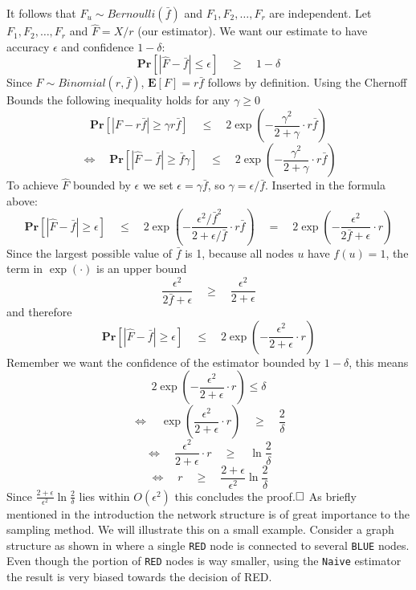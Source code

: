 It follows that $F_u \sim  Bernoulli(\bar{f})$ and $F_1, F_2, \ldots , F_r$ are independent.
Let $F_1, F_2, \ldots , F_r$ and $\hat{F} = X/r$ (our estimator).
We want our estimate to have accuracy $\epsilon$ and confidence $1-\delta$:
$$\textbf{Pr}[|\hat{F}-\bar{f} | \leq \epsilon] \quad\geq\quad 1-\delta$$
Since $F \sim Binomial(r,\bar{f})$, $\textbf{E}[F] = r\bar{f}$ follows by definition.
Using the Chernoff Bounds the following inequality holds for any $\gamma \geq 0$
$$\textbf{Pr}[|F-r\bar{f}|\geq \gamma r\bar{f}] \quad\leq\quad 2\exp(-\frac{\gamma^2}{2+\gamma}\cdot r\bar{f})$$
$$\Leftrightarrow\quad \textbf{Pr}[|\hat{F}-\bar{f}|\geq \bar{f}\gamma] \quad\leq\quad 2\exp(-\frac{\gamma^2}{2+\gamma}\cdot r\bar{f})$$
To achieve $\hat{F}$ bounded by $\epsilon$ we set $\epsilon = \gamma\bar{f}$, so $\gamma = \epsilon/\bar{f}$. Inserted in the formula above:
$$\textbf{Pr}[|\hat{F}-\bar{f}| \geq \epsilon] \quad\leq\quad 2\exp (-\frac{\epsilon^2/\bar{f}^2}{2+\epsilon/\bar{f}}\cdot r\bar{f}) \quad=\quad 2\exp(-\frac{\epsilon^2}{2\bar{f}+\epsilon}\cdot r)$$
Since the largest possible value of $\bar{f}$ is 1, because all nodes $u$ have $f(u) = 1$, the term in $\exp(\cdot)$ is an upper bound
$$\frac{\epsilon^2}{2\bar{f}+\epsilon} \quad\geq\quad \frac{\epsilon^2}{2+\epsilon}$$
and therefore
$$\textbf{Pr}[|\hat{F}-\bar{f}| \geq \epsilon] \quad\leq\quad 2\exp(-\frac{\epsilon^2}{2+\epsilon}\cdot r)$$
Remember we want the confidence of the estimator bounded by $1-\delta$, this means
$$2\exp(-\frac{\epsilon^2}{2+\epsilon}\cdot r) \leq \delta$$
$$\Leftrightarrow\quad \exp(\frac{\epsilon^2}{2+\epsilon}\cdot r) \quad\geq\quad \frac{2}{\delta}$$
$$\Leftrightarrow\quad \frac{\epsilon^2}{2+\epsilon}\cdot r \quad\geq\quad \ln\frac{2}{\delta}$$
$$\Leftrightarrow\quad r \quad\geq\quad \frac{2+\epsilon}{\epsilon^2}\ln\frac{2}{\delta}$$
Since $\frac{2+\epsilon}{\epsilon^2}\ln\frac{2}{\delta}$ lies within $O(\epsilon^2)$ this concludes the proof.$\hfill\square$
\newline\newline
As briefly mentioned in the introduction the network structure is of great importance to the sampling method.
We will illustrate this on a small example. Consider a graph structure as shown in  where a single \texttt{RED} node is connected to several \texttt{BLUE} nodes.
Even though the portion of \texttt{RED} nodes is way smaller, using the \texttt{Naive} estimator the result is very biased towards the decision of {RED}.

